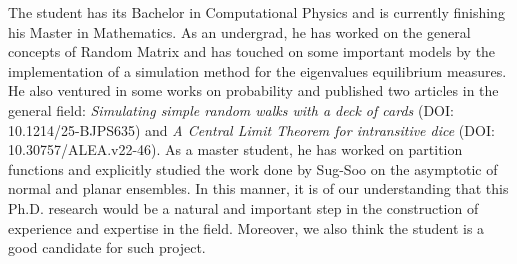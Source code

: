 The student has its Bachelor in Computational Physics and is currently finishing his Master in Mathematics. As an undergrad, he has worked on the general concepts of Random Matrix and has touched on some important models by the implementation of a simulation method for the eigenvalues equilibrium measures. He also ventured in some works on probability and published two articles in the general field: \textit{Simulating simple random walks with a deck of cards} (DOI: 10.1214/25-BJPS635) and \textit{A Central Limit Theorem for intransitive dice} (DOI: 10.30757/ALEA.v22-46). As a master student, he has worked on partition functions and explicitly studied the work done by Sug-Soo on the asymptotic of normal and planar ensembles. In this manner, it is of our understanding that this Ph.D. research would be a natural and important step in the construction of experience and expertise in the field. Moreover, we also think the student is a good candidate for such project.